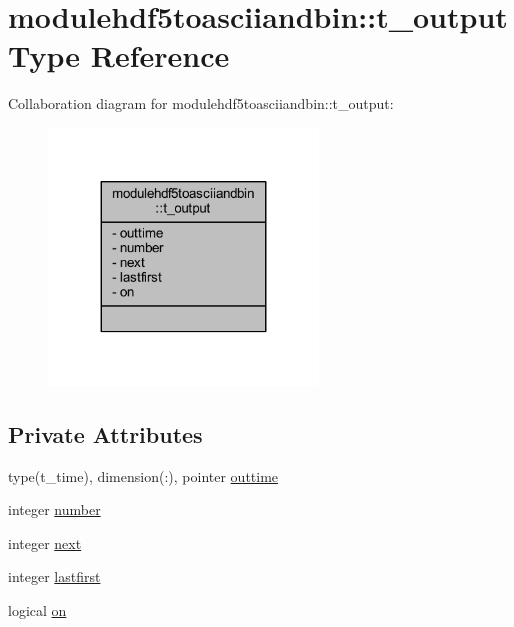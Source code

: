 \hypertarget{structmodulehdf5toasciiandbin_1_1t__output}{}\section{modulehdf5toasciiandbin\+:\+:t\+\_\+output Type Reference}
\label{structmodulehdf5toasciiandbin_1_1t__output}


Collaboration diagram for modulehdf5toasciiandbin\+:\+:t\+\_\+output\+:\nopagebreak
\begin{figure}[H]
\begin{center}
\leavevmode
\includegraphics[width=203pt]{structmodulehdf5toasciiandbin_1_1t__output__coll__graph}
\end{center}
\end{figure}
\subsection*{Private Attributes}
\begin{DoxyCompactItemize}
\item 
type(t\+\_\+time), dimension(\+:), pointer \mbox{\hyperlink{structmodulehdf5toasciiandbin_1_1t__output_afbe5b898a559f9325f92a79e4daff3a1}{outtime}}
\item 
integer \mbox{\hyperlink{structmodulehdf5toasciiandbin_1_1t__output_ad43a9ffbcd0ba209b6fbe0de29a9ae80}{number}}
\item 
integer \mbox{\hyperlink{structmodulehdf5toasciiandbin_1_1t__output_a6eff83049a708f24b0a26ea692031609}{next}}
\item 
integer \mbox{\hyperlink{structmodulehdf5toasciiandbin_1_1t__output_a3aec2a57eb2015b9357e8cf545406f3c}{lastfirst}}
\item 
logical \mbox{\hyperlink{structmodulehdf5toasciiandbin_1_1t__output_a4514d386145bac53eb5e98cb33e24112}{on}}
\end{DoxyCompactItemize}


